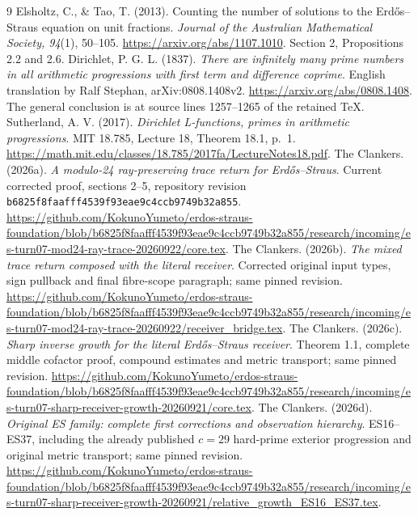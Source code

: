 \begin{thebibliography}{9}
Elsholtz, C., \& Tao, T. (2013).
Counting the number of solutions to the Erd\H{o}s--Straus equation on unit fractions.
\emph{Journal of the Australian Mathematical Society, 94}(1), 50--105.
\url{https://arxiv.org/abs/1107.1010}. Section 2, Propositions 2.2 and 2.6.
Dirichlet, P. G. L. (1837). \emph{There are infinitely many prime numbers in
all arithmetic progressions with first term and difference coprime}.
English translation by Ralf Stephan, arXiv:0808.1408v2.
\url{https://arxiv.org/abs/0808.1408}. The general conclusion is at source
lines 1257--1265 of the retained TeX.
Sutherland, A. V. (2017). \emph{Dirichlet L-functions, primes in arithmetic
progressions}. MIT 18.785, Lecture 18, Theorem 18.1, p.~1.
\url{https://math.mit.edu/classes/18.785/2017fa/LectureNotes18.pdf}.
The Clankers. (2026a). \emph{A modulo-24 ray-preserving trace return for
Erd\H{o}s--Straus}. Current corrected proof, sections 2--5, repository
revision \texttt{b6825f8faafff4539f93eae9c4ccb9749b32a855}.
\url{https://github.com/KokunoYumeto/erdos-straus-foundation/blob/b6825f8faafff4539f93eae9c4ccb9749b32a855/research/incoming/es-turn07-mod24-ray-trace-20260922/core.tex}.
The Clankers. (2026b). \emph{The mixed trace return composed with the literal
receiver}. Corrected original input types, sign pullback and final fibre-scope
paragraph; same pinned revision.
\url{https://github.com/KokunoYumeto/erdos-straus-foundation/blob/b6825f8faafff4539f93eae9c4ccb9749b32a855/research/incoming/es-turn07-mod24-ray-trace-20260922/receiver_bridge.tex}.
The Clankers. (2026c). \emph{Sharp inverse growth for the literal
Erd\H{o}s--Straus receiver}. Theorem 1.1, complete middle cofactor proof,
compound estimates and metric transport; same pinned revision.
\url{https://github.com/KokunoYumeto/erdos-straus-foundation/blob/b6825f8faafff4539f93eae9c4ccb9749b32a855/research/incoming/es-turn07-sharp-receiver-growth-20260921/core.tex}.
The Clankers. (2026d). \emph{Original ES family: complete first corrections
and observation hierarchy}. ES16--ES37, including the already published
$c=29$ hard-prime exterior progression and original metric transport;
same pinned revision.
\url{https://github.com/KokunoYumeto/erdos-straus-foundation/blob/b6825f8faafff4539f93eae9c4ccb9749b32a855/research/incoming/es-turn07-sharp-receiver-growth-20260921/relative_growth_ES16_ES37.tex}.
\end{thebibliography}
